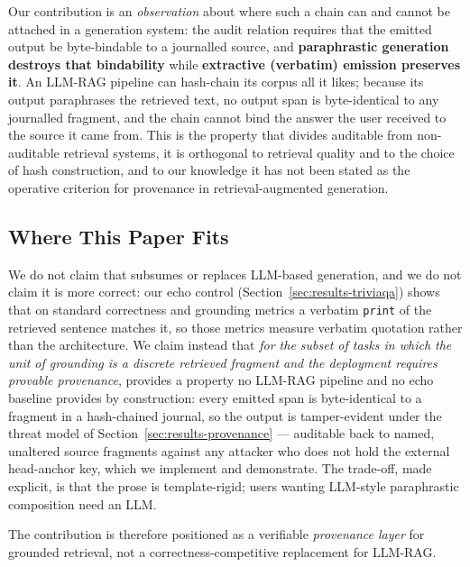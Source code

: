 Our contribution is an \emph{observation} about where such a chain
can and cannot be attached in a generation system: the audit
relation requires that the emitted output be byte-bindable to a
journalled source, and \textbf{paraphrastic generation destroys
that bindability} while \textbf{extractive (verbatim) emission
preserves it}. An LLM-RAG pipeline can hash-chain its corpus all it
likes; because its output paraphrases the retrieved text, no output
span is byte-identical to any journalled fragment, and the chain
cannot bind the answer the user received to the source it came
from. This is the property that divides auditable from
non-auditable retrieval systems, it is orthogonal to retrieval
quality and to the choice of hash construction, and to our
knowledge it has not been stated as the operative criterion for
provenance in retrieval-augmented generation.

\subsection{Where This Paper Fits}

We do not claim that \hyphae{} subsumes or replaces LLM-based
generation, and we do not claim it is more correct: our echo
control (Section~\ref{sec:results-triviaqa}) shows that on
standard correctness and grounding metrics a verbatim
\texttt{print} of the retrieved sentence matches it, so those
metrics measure verbatim quotation rather than the architecture.
We claim instead that \emph{for the subset of tasks in which the
unit of grounding is a discrete retrieved fragment and the
deployment requires provable provenance}, \hyphae{} provides a
property no LLM-RAG pipeline and no echo baseline provides by
construction: every emitted span is byte-identical to a fragment
in a hash-chained journal, so the output is
tamper-evident under the threat model of
Section~\ref{sec:results-provenance} --- auditable back to named,
unaltered source fragments against any attacker who does not hold
the external head-anchor key, which we implement and demonstrate. The trade-off, made
explicit, is that the prose is template-rigid; users wanting
LLM-style paraphrastic composition need an LLM.

The contribution is therefore positioned as a verifiable
\emph{provenance layer} for grounded retrieval, not a
correctness-competitive replacement for LLM-RAG.
